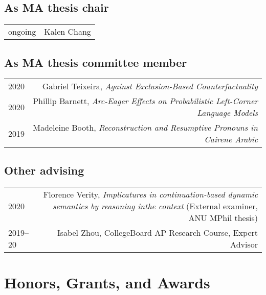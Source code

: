 \documentclass[12pt]{article}
\begin{document}
\subsection*{As MA thesis chair}

\begin{longtable}{LR}
  ongoing & Kalen Chang
\end{longtable}

\subsection*{As MA thesis committee member}

\begin{longtable}{LR}
  2020    & Gabriel Teixeira, \textit{Against Exclusion-Based Counterfactuality}\\
  2020    & Phillip Barnett, \textit{Arc-Eager Effects on Probabilistic
            Left-Corner Language Models}\\
  2019    & Madeleine Booth, \textit{Reconstruction and Resumptive Pronouns in
            Cairene Arabic}
\end{longtable}

\subsection*{Other advising}

\begin{longtable}{LR}
  2020     & Florence Verity, \textit{Implicatures in continuation-based dynamic
             semantics by reasoning inthe context} (External examiner, ANU MPhil
             thesis)
  \\
  2019--20 & Isabel Zhou, CollegeBoard AP Research Course, Expert Advisor
\end{longtable}


\medskip

\section*{Honors, Grants, and Awards}
\end{document}
